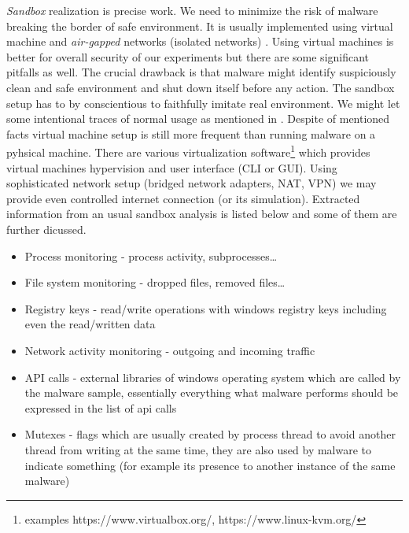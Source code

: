 \emph{Sandbox} realization is precise work. We need to minimize the risk of malware breaking the border of safe environment. It is usually implemented using virtual machine and \emph{air-gapped} networks (isolated networks) \cite{Sikorski2012}. Using virtual machines is better for overall security of our experiments but there are some significant pitfalls as well. The crucial drawback is that malware might identify suspiciously clean and safe environment and shut down itself before any action. The sandbox setup has to by conscientious to faithfully imitate real environment. We might let some intentional traces of normal usage as mentioned in \cite{CAPESand75:online}. Despite of mentioned facts virtual machine setup is still more frequent than running malware on a pyhsical machine. There are various virtualization software\footnote{examples https://www.virtualbox.org/, https://www.linux-kvm.org/} which provides virtual machines hypervision and user interface (CLI or GUI). Using sophisticated network setup (bridged network adapters, NAT, VPN) we may provide even controlled internet connection (or its simulation). Extracted information from an usual sandbox analysis is listed below and some of them are further dicussed.

\begin{itemize}
  \item Process monitoring - process activity, subprocesses\dots
  \item File system monitoring - dropped files, removed files\dots
  \item Registry keys - read/write operations with windows registry keys including even the read/written data
  \item Network activity monitoring - outgoing and incoming traffic
  \item API calls - external libraries of windows operating system which are called by the malware sample, essentially everything what malware performs should be expressed in the list of api calls
  \item Mutexes - flags which are usually created by process thread to avoid another thread from writing at the same time, they are also used by malware to indicate something (for example its presence to another instance of the same malware)
\end{itemize}


